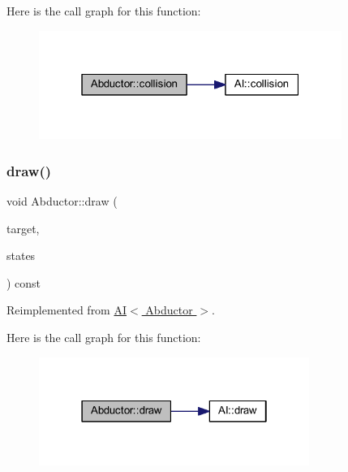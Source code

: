 Here is the call graph for this function\+:
\nopagebreak
\begin{figure}[H]
\begin{center}
\leavevmode
\includegraphics[width=280pt]{class_abductor_a247dff8e49fc656700c8cb16ed08252d_cgraph}
\end{center}
\end{figure}
\mbox{\label{class_abductor_aebaf5c5a2882f41c8e1ed1b18f80e3d1}} 
\subsubsection{\texorpdfstring{draw()}{draw()}}
{\footnotesize\ttfamily void Abductor\+::draw (\begin{DoxyParamCaption}\item[{sf\+::\+Render\+Target \&}]{target,  }\item[{sf\+::\+Render\+States}]{states }\end{DoxyParamCaption}) const\hspace{0.3cm}{\ttfamily [virtual]}}



Reimplemented from \hyperlink{class_a_i_a8a7423a8612cfd777f3b5eeae4764d50}{A\+I$<$ Abductor $>$}.

Here is the call graph for this function\+:
\nopagebreak
\begin{figure}[H]
\begin{center}
\leavevmode
\includegraphics[width=250pt]{class_abductor_aebaf5c5a2882f41c8e1ed1b18f80e3d1_cgraph}
\end{center}
\end{figure}
\mbox{\label{class_abductor_a12b84d9d38bec8ed3b495c5657903e50}} 
